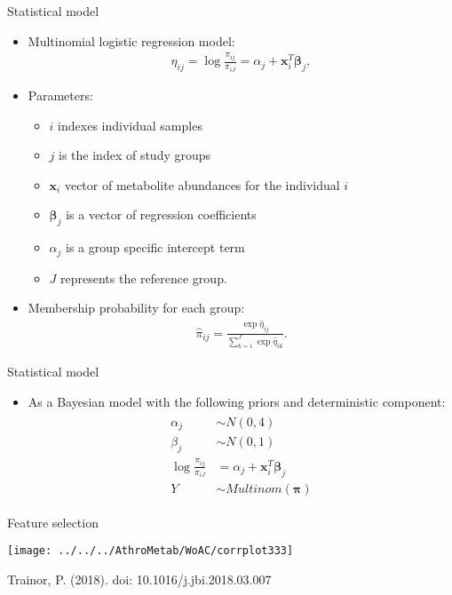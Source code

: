 \documentclass[xcolor=dvipsnames]{beamer}
\begin{document}
\begin{frame}{Statistical model}
\vspace{-10.5pt}
\begin{itemize}
\item Multinomial logistic regression model:
\begin{align*}
\eta_{ij} = \log \frac{\pi_{ij}}{\pi_{iJ}} = \alpha_j + \textbf{x}_i^T \boldsymbol{\beta}_j,
\end{align*} \pause
\item Parameters:
\begin{itemize}
\item $i$ indexes individual samples
\item $j$ is the index of study groups
\item $\textbf{x}_i$ vector of metabolite abundances for the individual $i$
\item $\boldsymbol{\beta}_j$ is a vector of regression coefficients 
\item $\alpha_j$ is a group specific intercept term
\item $J$ represents the reference group.
\end{itemize} \pause
\item Membership probability for each group:
\begin{align*}
\hat{\pi}_{ij} = \frac{\exp \hat{\eta}_{ij}}{\sum_{k=1}^{J}\exp \hat{\eta}_{ik}}.
\end{align*}
\end{itemize}
\end{frame}

\begin{frame}{Statistical model}
\vspace{-10.5pt}
\begin{itemize}
\item As a Bayesian model with the following priors and deterministic component:
\begin{align*}
\begin{split}
\alpha_j &\sim N(0,4) \\
\beta_j &\sim N(0,1) \\
\log \frac{\pi_{ij}}{\pi_{iJ}} &= \alpha_j + \textbf{x}_i^T \boldsymbol{\beta}_j \\
Y &\sim Multinom(\boldsymbol{\pi})
\end{split}
\end{align*}
\end{itemize}
\end{frame}

\begin{frame}{Feature selection}
\vspace{-10pt}
\begin{center}
\texttt{[image: ../../../AthroMetab/WoAC/corrplot333]}

Trainor, P. (2018). doi: 10.1016/j.jbi.2018.03.007 
\end{center}
\end{frame}
\end{document}
